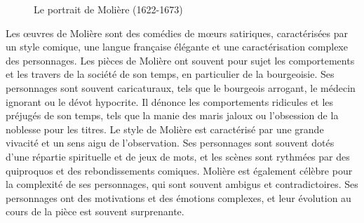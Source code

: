 \documentclass[UTF8,a4paper,12pt]{ctexart}
\numberwithin{equation}{section}
\newcommand{\mycite}[1]{\cite{#1}}
\begin{document}
\begin{figure}[H] 
\caption{Le portrait de Molière (1622-1673)}
\end{figure}
Les œuvres de Molière sont des comédies de mœurs satiriques, caractérisées par un style comique, une langue française élégante et une caractérisation complexe des personnages. Les pièces de Molière ont souvent pour sujet les comportements et les travers de la société de son temps, en particulier de la bourgeoisie. Ses personnages sont souvent caricaturaux, tels que le bourgeois arrogant, le médecin ignorant ou le dévot hypocrite\mycite{gaines1984social}. Il dénonce les comportements ridicules et les préjugés de son temps, tels que la manie des maris jaloux ou l'obsession de la noblesse pour les titres. Le style de Molière est caractérisé par une grande vivacité et un sens aigu de l'observation. Ses personnages sont souvent dotés d'une répartie spirituelle et de jeux de mots, et les scènes sont rythmées par des quiproquos et des rebondissements comiques. Molière est également célèbre pour la complexité de ses personnages, qui sont souvent ambigus et contradictoires. Ses personnages ont des motivations et des émotions complexes, et leur évolution au cours de la pièce est souvent surprenante.
\end{document}
